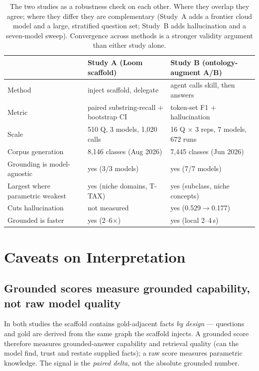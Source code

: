 \documentclass[11pt]{article}
\begin{document}
\begin{samepage}
\begin{table}[h]\centering\small
\begin{tabularx}{\linewidth}{lXX}
\toprule
 & \textbf{Study A (Loom scaffold)} & \textbf{Study B (ontology-augment A/B)} \\
\midrule
Method & inject scaffold, delegate & agent calls skill, then answers \\
Metric & paired substring-recall + bootstrap CI & token-set F1 + hallucination \\
Scale & 510 Q, 3 models, 1{,}020 calls & 16 Q $\times$ 3 reps, 7 models, 672 runs \\
Corpus generation & 8{,}146 classes (Aug 2026) & 7{,}445 classes (Jun 2026) \\
Grounding is model-agnostic & yes (3/3 models) & yes (7/7 models) \\
Largest where parametric weakest & yes (niche domains, T-TAX) & yes (subclass, niche concepts) \\
Cuts hallucination & not measured & yes (0.529$\to$0.177) \\
Grounded is faster & yes (2--6$\times$) & yes (local 2--4\,s) \\
\bottomrule
\end{tabularx}
\caption{The two studies as a robustness check on each other. Where they overlap they agree;
where they differ they are complementary (Study~A adds a frontier cloud model and a large,
stratified question set; Study~B adds hallucination and a seven-model sweep). Convergence across
methods is a stronger validity argument than either study alone.}
\end{table}
\end{samepage}

\section{Caveats on Interpretation}

\begin{samepage}
\subsection{Grounded scores measure grounded capability, not raw model quality}
In both studies the scaffold contains gold-adjacent facts \emph{by design} --- questions and gold
are derived from the same graph the scaffold injects. A grounded score therefore measures
grounded-answer capability and retrieval quality (can the model find, trust and restate supplied
facts); a raw score measures parametric knowledge. The signal is the \emph{paired delta}, not the
absolute grounded number.
\end{samepage}
\end{document}
